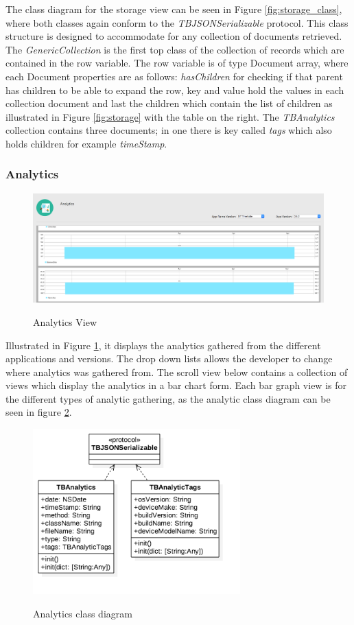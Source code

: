 The class diagram for the storage view can be seen in Figure \ref{fig:storage_class}, where both classes again conform to the \textit{TBJSONSerializable} protocol. This class structure is designed to accommodate for any collection of documents retrieved. The \textit{GenericCollection} is the first top class of the collection of records which are contained in the row variable. The row variable is of type Document array, where each Document properties are as follows: \textit{hasChildren} for checking if that parent has children to be able to expand the row, key and value hold the values in each collection document and last the children which contain the list of children as illustrated in Figure \ref{fig:storage} with the table on the right. The \textit{TBAnalytics} collection contains three documents; in one there is key called \textit{tags} which also holds children for example \textit{timeStamp}.

\subsubsection{Analytics}

\begin{figure}[!h]
    \caption{Analytics View}
    \centering
    \includegraphics[width=120mm]{images/dashboard/analytics}
    \label{fig:analytics}
\end{figure}

Illustrated in Figure \ref{fig:analytics}, it displays the analytics gathered from the different applications and versions. The drop down lists allows the developer to change where analytics was gathered from. The scroll view below contains a collection of views which display the analytics in a bar chart form. Each bar graph view is for the different types of analytic gathering, as the analytic class diagram can be seen in figure \ref{fig:analytics_class}.

\begin{figure}[!h]
    \caption{Analytics class diagram}
    \centering
    \includegraphics[width=80mm]{images/classdiagrams/analytics_class}
    \label{fig:analytics_class}
\end{figure}

